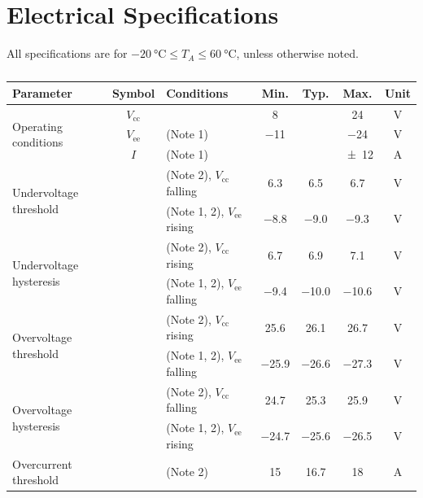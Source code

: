 \documentclass[10pt]{datasheet}
\begin{document}
\section{Electrical Specifications}
All specifications are for $\qty{-20}{\celsius} \leq T_A \leq \qty{60}{\celsius}$, unless otherwise noted.
\begin{table}[h!]
    \caption{}
    \begin{threeparttable}
        \begin{tabularx}{\textwidth}{l | c | X | c c c | c}
            \thickhline
            \textbf{Parameter} & \textbf{Symbol} & \textbf{Conditions} & \textbf{Min.} & \textbf{Typ.} & \textbf{Max.} &
            \textbf{Unit} \\
            \hline
            \multirow{3}{*}{Operating conditions}  & $V_\text{cc}$ &  & \num{8} & & \num{24} & \unit{\V} \\
            & $V_\text{ee}$ & (Note 1) & \num{-11} & & \num{-24} & \unit{V} \\
            & $I$ & (Note 1) & & & \num{\pm 12} & \unit{\A} \\
            \hline
            \multirow{2}{*}{Undervoltage threshold} & & (Note 2), $V_\text{cc}$ falling & \num{6.3} & \num{6.5} & \num{6.7} & \unit{\V} \\
             & & (Note 1, 2), $V_\text{ee}$ rising & \num{-8.8} & \num{-9.0} & \num{-9.3} & \unit{\V} \\
            \multirow{2}{*}{Undervoltage hysteresis} & &(Note 2), $V_\text{cc}$ rising & \num{6.7} & \num{6.9} & \num{7.1} & \unit{\V} \\
             & & (Note 1, 2), $V_\text{ee}$ falling & \num{-9.4} & \num{-10.0} & \num{-10.6} & \unit{\V} \\
            \multirow{2}{*}{Overvoltage threshold} & & (Note 2), $V_\text{cc}$ rising & \num{25.6} & \num{26.1}& \num{26.7} & \unit{\V} \\
             & & (Note 1, 2), $V_\text{ee}$ falling & \num{-25.9} & \num{-26.6}& \num{-27.3} & \unit{\V} \\
            \multirow{2}{*}{Overvoltage hysteresis} & & (Note 2), $V_\text{cc}$ falling & \num{24.7} & \num{25.3}& \num{25.9} & \unit{\V} \\
             & & (Note 1, 2), $V_\text{ee}$ rising & \num{-24.7} & \num{-25.6}& \num{-26.5} & \unit{\V} \\
            \multirow{2}{*}{Overcurrent threshold} & & (Note 2) & \num{15} & \num{16.7} & \num{18} & \unit{\A} \\

\end{tabularx}
\end{threeparttable}
\end{table}
\end{document}
